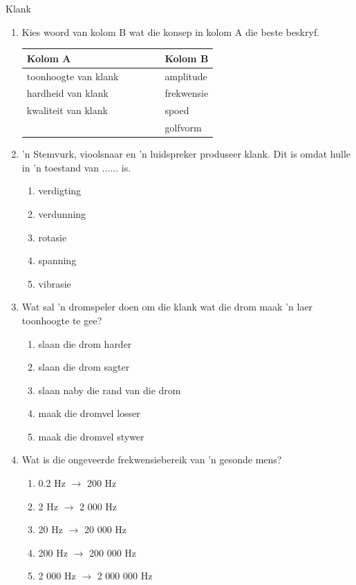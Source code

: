 \begin{eocexercises}{Klank}
            \nopagebreak
\begin{enumerate}[noitemsep, label=\textbf{\arabic*}. ] 
\item Kies \n woord van kolom B wat die konsep in kolom A die beste beskryf. 
          \begin{center}
\begin{tabular}{ll}
\textbf{Kolom A} & \textbf{Kolom B} \\ \hline
toonhoogte van klank \ \ \ & amplitude \\
hardheid van klank \ \ \ \ \ \ \ \ \ & frekwensie \\
kwaliteit van klank \ \ \ & spoed \\
& golfvorm \\
\end{tabular}
\end{center}
    \par
\item 'n Stemvurk, vioolsnaar en 'n luidspreker produseer klank. Dit is omdat hulle in 'n toestand van ...... is.
\begin{enumerate}[noitemsep, label=\textbf{\alph*}. ] 
    \item verdigting
    \item verdunning
    \item rotasie
    \item spanning
    \item vibrasie
\end{enumerate}

\item Wat sal 'n dromspeler doen om die klank wat die drom maak 'n laer toonhoogte te gee?
\begin{enumerate}[noitemsep, label=\textbf{\alph*}. ] 
    \item slaan die drom harder
    \item slaan die drom sagter
    \item slaan naby die rand van die drom
    \item maak die dromvel losser
    \item maak die dromvel stywer
\end{enumerate}

\item Wat is die ongeveerde frekwensiebereik van 'n gesonde mens?
\begin{enumerate}[noitemsep, label=\textbf{\alph*}. ] 
\item 0.2 Hz $\to $ 200 Hz
\item 2 Hz $\to $ 2 000 Hz
\item 20 Hz $\to $ 20 000 Hz
\item 200 Hz $\to $ 200 000 Hz
\item 2 000 Hz $\to $ 2 000 000 Hz
\end{enumerate}
                

\end{enumerate}
\end{eocexercises}
